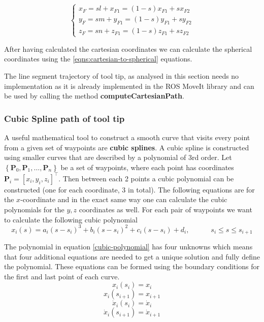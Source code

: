 \begin{equation}
\begin{cases}
x^{}_{F} = sl + x^{}_{F1} = (1-s)x^{}_{F1} + sx^{}_{F2} \\
y^{}_{F} = sm + y^{}_{F1} = (1-s)y^{}_{F1} + sy^{}_{F2} \\
z^{}_{F} = sn + z^{}_{F1} = (1-s)z^{}_{F1} + sz^{}_{F2}
\end{cases}
\end{equation}

After having calculated the cartesian coordinates we can calculate the spherical coordinates using the \ref{eqns:cartesian-to-spherical} equations.

The line segment trajectory of tool tip, as analysed in this section needs no implementation as 
it is already implemented in the ROS MoveIt library and can be used by calling the method 
\textbf{computeCartesianPath}.

\subsubsection{Cubic Spline path of tool tip}

A useful mathematical tool to construct a smooth curve that visits every point from a given set of waypoints are \textbf{cubic splines}. A cubic spline is 
constructed using smaller curves that are described by a polynomial of 3rd order. Let $\left\lbrace \mathbf{P}_0, \mathbf{P}_1, \ldots , \mathbf{P}_n \right\rbrace$ 
be a set of waypoints, where each point has coordinates $\mathbf{P}_i = [x_i, y_i, z_i]^\top$. Then between each 2 points a cubic 
polynomial can be constructed (one for each coordinate, 3 in total). The following equations are for the $x$-coordinate and in the exact same way one can 
calculate the cubic polynomials for the $y,z$ coordinates as well. For each pair of waypoints we want to calculate the following cubic polynomial
\begin{equation}
\label{cubic-polynomial}
x_i(s) = a_i(s-s_i)^3 + b_i(s-s_i)^2 + c_i(s-s_i) + d_i, \hspace{3em} s_i \leqslant s \leqslant s_{i+1}
\end{equation}

The polynomial in equation \ref{cubic-polynomial} has four unknowns which means that four additional equations are needed to get a unique solution and fully 
define the polynomial. These equations can be formed using the boundary conditions for the first and last point of each curve.
\begin{equation}
x_i(s_i) = x_i
\end{equation}
\begin{equation}
x_i(s_{i+1}) = x_{i+1}
\end{equation}
\begin{equation}
\dot{x}_i(s_i) = \dot{x}_i
\end{equation}
\begin{equation}
\dot{x}_i(s_{i+1}) = \dot{x}_{i+1}
\end{equation}

